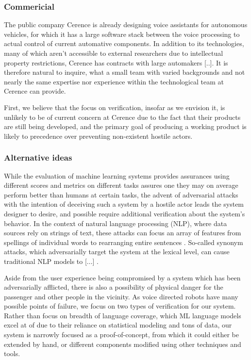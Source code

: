 \documentclass[a4paper, 11pt]{article}
\begin{document}
\subsubsection{Commericial}

The public company Cerence \cite{} is already designing voice assistants for autonomous
vehicles, for which it has a large software stack between the voice processing
to actual control of current automative components. In addition to its 
technologies, many of which aren't accessible to external researchers due to
intellectual property restrictions, Cerence has contracts with large automakers
[..]. It is therefore natural to inquire, what a small team with varied
backgrounds and not nearly the same expertise nor experience within the
technological team at Cerence can provide.

First, we believe that the focus on verification, insofar as we envision it, is
unlikely to be of current concern at Cerence due to the fact that their products
are still being developed, and the primary goal of producing a working product
is likely to precedence over preventing non-existent hostile actors.

\subsubsection{Alternative ideas}

While the evaluation of machine learning systems provides assurances using
different scores and metrics on different tasks assures one they may on average
perform better than humans at certain tasks, the advent of adversarial attacks
\cite{szegedy} with the intention of deceiving such a system by a hostile actor
leads the system designer to desire, and possible require additional
verification about the system's behavior. In the context of natural language
processing (NLP), where data sources rely on strings of text, these attacks can
focus an array of features from spellings of individual words to rearranging
entire sentences \cite{}. So-called synonym attacks, which adversarially target
the system at the lexical level, can cause traditional NLP models to [...]
\cite{}.


Aside from the user experience being compromised by a system which has been
adversarially afflicted, there is also a possibility of physical danger for the
passenger and other people in the vicinity. As voice directed robots have many
possible points of failure, we focus on two types of verification for our
system. Rather than focus on breadth of language coverage, which ML language
models excel at of due to their reliance on statistical modeling and tons
of data, our system is narrowly focused as a proof-of-concept, from which it
could either be extended by hand, or different components modified using
other techniques and tools.
\end{document}
